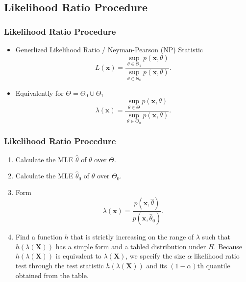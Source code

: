 \documentclass[serif,mathserif,professionalfont]{beamer}
\begin{document}
\subsection{Likelihood Ratio Procedure}

\begin{frame}
	
	\frametitle{Likelihood Ratio Procedure}
	
	\begin{itemize}
		\item Generlized Likelihood Ratio / Neyman-Pearson (NP) Statistic
		\begin{equation*}
		L\left(\mathbf{x} \right) = \frac{\sup_{\theta \in \Theta_1} p\left(\mathbf{x}, \theta \right)}{\sup_{\theta \in \Theta_0} p\left(\mathbf{x}, \theta \right)}.
		\end{equation*}
		\item Equivalently for $ \Theta = \Theta_0 \cup \Theta_1 $
		\begin{equation*}
		\lambda\left(\mathbf{x} \right) = \frac{\sup_{\theta \in \Theta} p\left(\mathbf{x}, \theta \right)}{\sup_{\theta \in \Theta_0} p\left(\mathbf{x}, \theta \right)}.
		\end{equation*}
	\end{itemize}
	
\end{frame}


\begin{frame}
	
	\frametitle{Likelihood Ratio Procedure}
	
	\begin{enumerate}[1]
		\item Calculate the MLE $ \widehat{\theta} $ of $ \theta $ over $ \Theta $.
		\item Calculate the MLE $ \widehat{\theta}_0 $ of $ \theta $ over $ \Theta_0 $.
		\item Form
		\begin{equation*}
		\lambda\left(\mathbf{x} \right) = \frac{p\left(\mathbf{x}, \widehat{\theta} \right)}{p\left(\mathbf{x}, \widehat{\theta}_0 \right)}.
		\end{equation*}
		\item Find a function $ h $ that is strictly increasing on the range of $ \lambda $ such that $ h\left(\lambda\left(\mathbf{X} \right) \right) $ has a simple form and a tabled distribution under $ H $. Because $ h\left(\lambda\left(\mathbf{X} \right) \right) $ is equivalent to $ \lambda\left(\mathbf{X} \right) $, we specify the size $ \alpha $ likelihood ratio test through the test statistic $ h\left(\lambda\left(\mathbf{X} \right) \right) $ and its $ \left(1-\alpha \right) $th quantile obtained from the table.
	\end{enumerate}
	
\end{frame}
\end{document}
